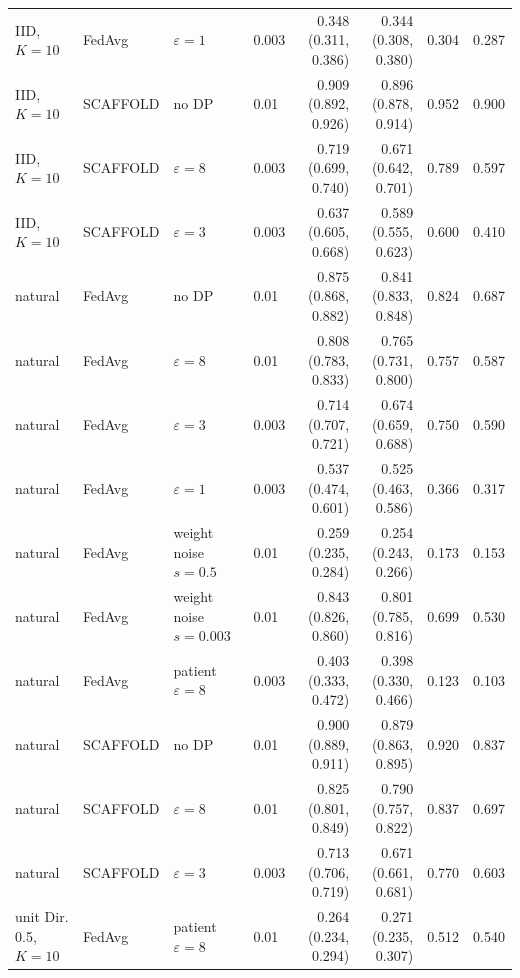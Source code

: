 {\begin{longtable}{llllrrrr}
IID, $K{=}10$ & FedAvg & $\varepsilon=1$ & 0.003 & 0.348 (0.311, 0.386) & 0.344 (0.308, 0.380) & 0.304 & 0.287 \\
IID, $K{=}10$ & SCAFFOLD & no DP & 0.01 & 0.909 (0.892, 0.926) & 0.896 (0.878, 0.914) & 0.952 & 0.900 \\
IID, $K{=}10$ & SCAFFOLD & $\varepsilon=8$ & 0.003 & 0.719 (0.699, 0.740) & 0.671 (0.642, 0.701) & 0.789 & 0.597 \\
IID, $K{=}10$ & SCAFFOLD & $\varepsilon=3$ & 0.003 & 0.637 (0.605, 0.668) & 0.589 (0.555, 0.623) & 0.600 & 0.410 \\
natural & FedAvg & no DP & 0.01 & 0.875 (0.868, 0.882) & 0.841 (0.833, 0.848) & 0.824 & 0.687 \\
natural & FedAvg & $\varepsilon=8$ & 0.01 & 0.808 (0.783, 0.833) & 0.765 (0.731, 0.800) & 0.757 & 0.587 \\
natural & FedAvg & $\varepsilon=3$ & 0.003 & 0.714 (0.707, 0.721) & 0.674 (0.659, 0.688) & 0.750 & 0.590 \\
natural & FedAvg & $\varepsilon=1$ & 0.003 & 0.537 (0.474, 0.601) & 0.525 (0.463, 0.586) & 0.366 & 0.317 \\
natural & FedAvg & weight noise $s=0.5$ & 0.01 & 0.259 (0.235, 0.284) & 0.254 (0.243, 0.266) & 0.173 & 0.153 \\
natural & FedAvg & weight noise $s=0.003$ & 0.01 & 0.843 (0.826, 0.860) & 0.801 (0.785, 0.816) & 0.699 & 0.530 \\
natural & FedAvg & patient $\varepsilon=8$ & 0.003 & 0.403 (0.333, 0.472) & 0.398 (0.330, 0.466) & 0.123 & 0.103 \\
natural & SCAFFOLD & no DP & 0.01 & 0.900 (0.889, 0.911) & 0.879 (0.863, 0.895) & 0.920 & 0.837 \\
natural & SCAFFOLD & $\varepsilon=8$ & 0.01 & 0.825 (0.801, 0.849) & 0.790 (0.757, 0.822) & 0.837 & 0.697 \\
natural & SCAFFOLD & $\varepsilon=3$ & 0.003 & 0.713 (0.706, 0.719) & 0.671 (0.661, 0.681) & 0.770 & 0.603 \\
unit Dir. 0.5, $K{=}10$ & FedAvg & patient $\varepsilon=8$ & 0.01 & 0.264 (0.234, 0.294) & 0.271 (0.235, 0.307) & 0.512 & 0.540 \\
\end{longtable}}


